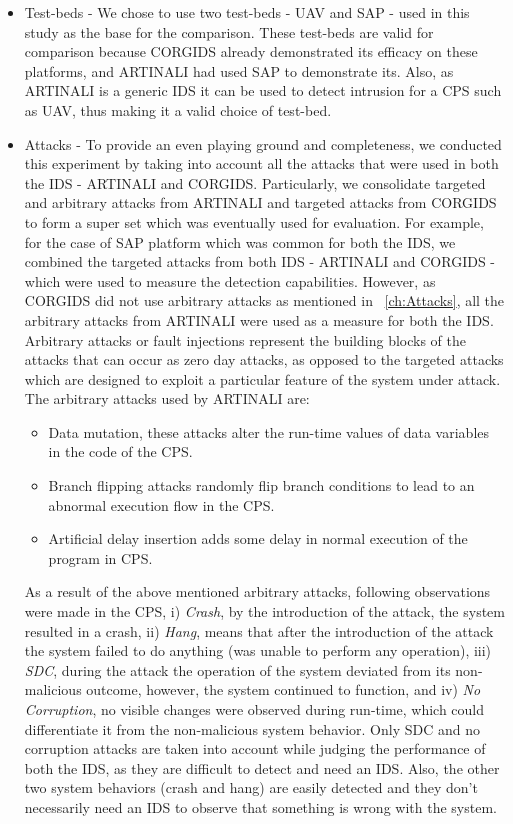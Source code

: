 \begin{itemize}
\item Test-beds - We chose to use two test-beds - UAV and SAP - used in this study as the base for the comparison. These test-beds are valid for comparison because CORGIDS already demonstrated its efficacy on these platforms, and ARTINALI had used SAP to demonstrate its. Also, as ARTINALI is a generic IDS it can be used to detect intrusion for a CPS such as UAV, thus making it  a valid choice of test-bed.

\item Attacks - To provide an even playing ground and completeness, we conducted this experiment by taking into account all the attacks that were used in both the IDS - ARTINALI and CORGIDS. Particularly, we consolidate targeted and arbitrary attacks from ARTINALI and targeted attacks from CORGIDS to form a super set which was eventually used for evaluation. For example, for the case of SAP platform which was common for both the IDS, we combined the targeted attacks from both IDS - ARTINALI and CORGIDS - which were used to measure the detection capabilities. However, as CORGIDS did not use arbitrary attacks as mentioned in ~\autoref{ch:Attacks}, all the arbitrary attacks from ARTINALI were used as a measure for both the IDS.
Arbitrary attacks or fault injections represent the building blocks of the attacks that can occur as zero day attacks, as opposed to the targeted attacks which are designed to exploit a particular feature of the system under attack. The arbitrary attacks used by ARTINALI are:

\begin{itemize}
\item Data mutation, these attacks alter the run-time values of data variables in the code of the CPS.
\item Branch flipping attacks randomly flip branch conditions to lead to an abnormal execution flow in the \ac{CPS}.
\item Artificial delay insertion adds some delay in normal execution of the program in CPS.
\end{itemize}

As a result of the above mentioned arbitrary attacks, following observations were made in the CPS, i) \textit{Crash}, by the introduction of the attack, the system resulted in a crash, ii) \textit{Hang}, means that after the introduction of the attack the system failed to do anything (was unable to perform any operation), iii) \textit{\ac{SDC}}, during the attack the operation of the system deviated from its non-malicious outcome, however, the system continued to function, and iv) \textit{No Corruption}, no visible changes were observed during run-time, which could differentiate it from the non-malicious system behavior. Only \ac{SDC} and no corruption attacks are taken into account while judging the performance of both the IDS, as they are difficult to detect and need an IDS. Also, the other two system behaviors (crash and hang) are easily detected and they don't necessarily need an IDS to observe that something is wrong with the system. 


\end{itemize}

